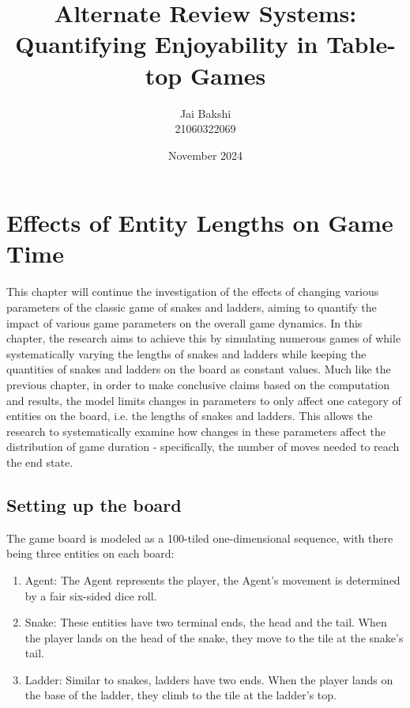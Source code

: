\documentclass[12pt]{report}
\title{Alternate Review Systems:\\ Quantifying Enjoyability in Table-top Games}
\author{Jai Bakshi \\ 21060322069}
\date{November 2024}
\begin{document}
	\maketitle
	\setcounter{chapter}{1}
	\chapter{Effects of Entity Lengths on Game Time}
	This chapter will continue the investigation of the effects of changing various parameters of the classic game of snakes and ladders, aiming to quantify the impact of various game parameters on the overall game dynamics. In this chapter, the research aims to achieve this by simulating numerous games of while systematically varying the lengths of snakes and ladders while keeping the quantities of snakes and ladders on the board as constant values. Much like the previous chapter, in order to make conclusive claims based on the computation and results, the model limits changes in parameters to only affect one category of entities on the board, i.e. the lengths of snakes and ladders. This allows the research to systematically examine how changes in these parameters affect the distribution of game duration - specifically, the number of moves needed to reach the end state.
	
	\section{Setting up the board}
	The game board is modeled as a 100-tiled one-dimensional sequence, with there being three entities on each board:

	\begin{enumerate}
		\item Agent: The Agent represents the player, the Agent's movement is determined by a fair six-sided dice roll. 
		\item Snake: These entities have two terminal ends, the head and the tail. When the player lands on the head of the snake, they move to the tile at the snake's tail.
		\item Ladder: Similar to snakes, ladders have two ends. When the player lands on the base of the ladder, they climb to the tile at the ladder's top.
	\end{enumerate}
\end{document}

